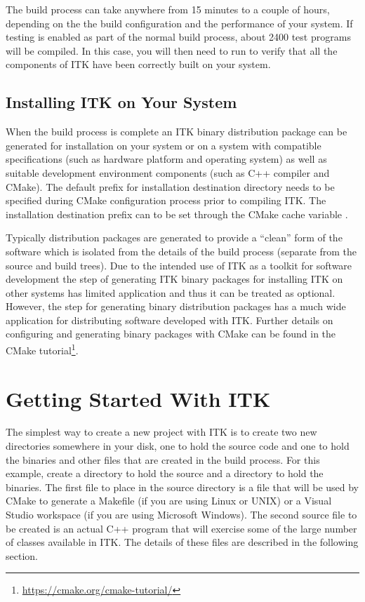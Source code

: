 The build process can take anywhere from 15 minutes to a couple of hours,
depending on the the build configuration and the performance of your
system. If testing is enabled as part of the normal build process,
about 2400 test programs will be compiled. In this case, you will then need
to run  to verify that all the components of ITK have been correctly built
on your system.

\subsection{Installing ITK on Your System}
\label{sec:Installation}


When the build process is complete an ITK binary distribution package can be
generated for installation on your system or on a system with compatible
specifications (such as hardware platform and operating system) as well as
suitable development environment components (such as C++ compiler and CMake).
The default prefix for installation destination directory needs to be specified
during CMake configuration process prior to compiling ITK. The installation
destination prefix can to be set through the CMake cache variable
.

Typically distribution packages are generated to provide a ``clean'' form of the
software which is isolated from the details of the build process (separate from
the source and build trees). Due to the intended use of ITK as a toolkit for
software development the step of generating ITK binary packages for installing
ITK on other systems has limited application and thus it can be treated as
optional. However, the step for generating binary distribution packages has a
much wide application for distributing software developed with ITK. Further
details on configuring and generating binary packages with CMake can be found in
the CMake tutorial\footnote{\url{https://cmake.org/cmake-tutorial/}}.

\section{Getting Started With ITK}
\label{sec:GettingStartedWithITK}

The simplest way to create a new project with ITK is to create two new
directories somewhere in your disk, one to hold the source code and one to
hold the binaries and other files that are created in the build process. For
this example, create a  directory to hold the source and a
 directory to hold the binaries. The first file to
place in the source directory is a  file that will be
used by CMake to generate a Makefile (if you are using Linux or UNIX) or a
Visual Studio workspace (if you are using Microsoft Windows). The second source
file to be created is an actual C++ program that will exercise some of the large
number of classes available in ITK. The details of these files are described in
the following section.

